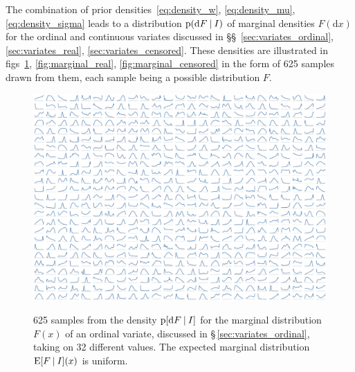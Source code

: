 \documentclass[\ifafour a4paper,12pt,\else a5paper,10pt,\fi%
onecolumn,oneside,article,%
british%
]{memoir}
\theoremstyle{remark}
\theoremstyle{innote}
\newcommand*{\di}{\mathrm{d}}%
\newcommand*{\p}{\mathrm{p}}%
\newcommand*{\E}{\mathrm{E}}
\renewcommand*{\|}[1][]{\nonscript\:#1\vert\nonscript\:\mathopen{}}
\newcommand*{\sect}{\S}%
\newcommand*{\sects}{\S\S}%
\newcommand*{\figs}{figs}%
\begin{document}
\medskip

The combination of prior densities~\eqref{eq:density_w}, \eqref{eq:density_mu}, \eqref{eq:density_sigma} leads to a distribution $\p(\di F\|I)$ of marginal densities $F(\di x)$ for the ordinal and continuous variates discussed in \sects~\ref{sec:variates_ordinal}, \ref{sec:variates_real}, \ref{sec:variates_censored}. These densities are illustrated in \figs~\ref{fig:marginal_integer}, \ref{fig:marginal_real}, \ref{fig:marginal_censored} in the form of 625 samples drawn from them, each sample being a possible distribution $F$.

\begin{figure}
\centering\includegraphics[width=\linewidth]{prior1D_integers_32.pdf}\\
\caption{625 samples from the density $\p[\di F \| I]$ for the marginal distribution $F(x)$ of an ordinal variate, discussed in \sect\,\ref{sec:variates_ordinal}, taking on 32 different values. The  expected marginal distribution $\E[F\| I](x)$ is uniform.}\label{fig:marginal_integer}
\end{figure}
\end{document}
